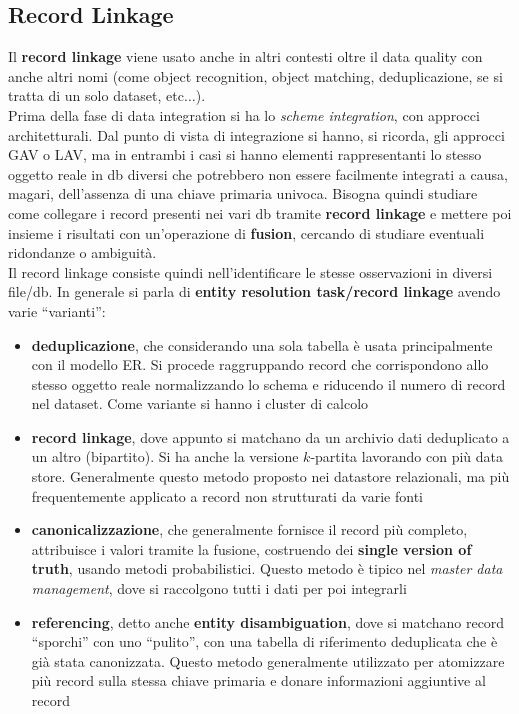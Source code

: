 \documentclass[a4paper,12pt, oneside]{book}
\begin{document}
\subsection{Record Linkage}
Il \textbf{record linkage} viene usato anche in altri contesti oltre il data
quality con anche altri nomi (come object recognition, object matching,
deduplicazione, se si tratta di un solo dataset, etc$\ldots$). \\
Prima della fase di data integration si ha lo \textit{scheme integration}, con
approcci architetturali. Dal punto di vista di integrazione si hanno, si
ricorda, gli approcci GAV o LAV, ma in entrambi i casi si hanno elementi
rappresentanti lo stesso oggetto reale in db diversi che
potrebbero non essere facilmente  integrati a causa, magari, dell'assenza di una
chiave primaria univoca. Bisogna quindi studiare come collegare i record
presenti nei vari db tramite \textbf{record linkage} e mettere poi insieme i
risultati con un'operazione di \textbf{fusion}, cercando di studiare eventuali
ridondanze o ambiguità.\\
Il record linkage consiste quindi nell'identificare le stesse osservazioni in
diversi file/db. In generale si parla di \textbf{entity resolution task/record
  linkage} avendo varie ``varianti'':
\begin{itemize}
  \item \textbf{deduplicazione}, che considerando una sola tabella è usata
  principalmente con il modello ER. Si procede raggruppando record che
  corrispondono allo stesso oggetto reale normalizzando lo schema e riducendo il
  numero di record nel dataset. Come variante si hanno i cluster di calcolo
  \item \textbf{record linkage}, dove appunto si matchano da un archivio dati
  deduplicato a un altro (bipartito). Si ha anche la versione $k$-partita
  lavorando con più data store. Generalmente questo metodo proposto nei
  datastore relazionali, ma più frequentemente applicato a record non
  strutturati da varie fonti 
  \item \textbf{canonicalizzazione}, che generalmente fornisce il record più
  completo, attribuisce i valori tramite la fusione, costruendo dei
  \textbf{single version of truth}, usando metodi probabilistici. Questo metodo
  è tipico nel \textit{master 
    data management}, dove si raccolgono tutti i dati per poi integrarli
  \item \textbf{referencing}, detto anche \textbf{entity disambiguation}, dove
  si matchano record ``sporchi'' con uno ``pulito'', con una tabella di
  riferimento deduplicata che è già stata canonizzata. Questo metodo
  generalmente utilizzato per atomizzare più record sulla stessa chiave primaria
  e donare informazioni aggiuntive al record  
\end{itemize}
\end{document}
